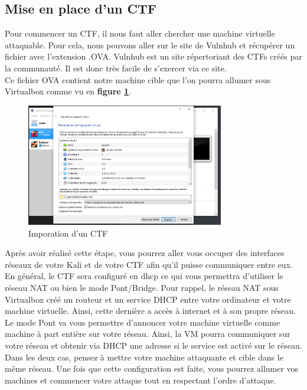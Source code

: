 \subsection{Mise en place d'un CTF}

Pour commencer un CTF, il nous faut aller chercher une machine virtuelle attaquable. Pour cela, nous pouvons aller sur le site de Vulnhub et récupérer un fichier avec l’extension .OVA. Vulnhub est un site répertoriant des CTFs créés par la communauté. Il est donc très facile de s'exercer via ce site.\\
Ce fichier OVA contient notre machine cible que l’on pourra allumer sous Virtualbox comme vu en \textbf{figure \ref{fig:import-ova}}.

\begin{figure}[htp!]
  \centering
  \setlength\figureheight{7cm}
  \setlength\figurewidth{9cm}
  \includegraphics[width=0.77\textwidth]{oui/images/Chapitre1/importation.png}
  \caption{Imporation d'un CTF}
  \label{fig:import-ova}
\end{figure}

Après avoir réalisé cette étape, vous pourrez aller vous occuper des interfaces réseaux de votre Kali et de votre CTF afin qu'il puisse communiquer entre eux. En général, le CTF sera configuré en dhcp ce qui vous permettra d'utiliser le réseau NAT ou bien le mode Pont/Bridge. Pour rappel, le réseau NAT sous Virtualbox créé un routeur et un service DHCP entre votre ordinateur et votre machine virtuelle. Ainsi, cette dernière a accès à internet et à son propre réseau. Le mode Pont va vous permettre d'annoncer votre machine virtuelle comme machine à part entière sur votre réseau. Ainsi, la VM pourra communiquer sur votre réseau et obtenir via DHCP une adresse si le service est activé sur le réseau. Dans les deux cas, pensez à mettre votre machine attaquante et cible dans le même réseau. Une fois que cette configuration est faite, vous pourrez allumer vos machines et commencer votre attaque tout en respectant l'ordre d'attaque.